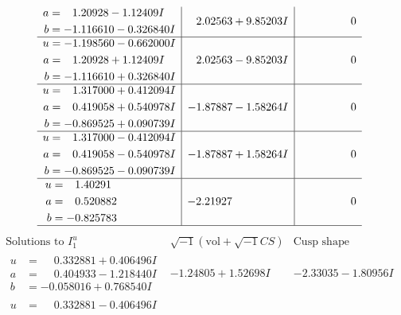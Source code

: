\documentclass[1p]{elsarticle_modified}
\theoremstyle{definition}
\newcommand{\I}{\sqrt{-1}}
\begin{document}
$$\begin{array}{c|c|c}
\begin{aligned}
a &= \phantom{-}1.20928 - 1.12409 I \\
b &= -1.116610 - 0.326840 I\end{aligned}
 & \phantom{-}2.02563 + 9.85203 I & \phantom{-0.000000 } 0 \\ \hline\begin{aligned}
u &= -1.198560 - 0.662000 I \\
a &= \phantom{-}1.20928 + 1.12409 I \\
b &= -1.116610 + 0.326840 I\end{aligned}
 & \phantom{-}2.02563 - 9.85203 I & \phantom{-0.000000 } 0 \\ \hline\begin{aligned}
u &= \phantom{-}1.317000 + 0.412094 I \\
a &= \phantom{-}0.419058 + 0.540978 I \\
b &= -0.869525 + 0.090739 I\end{aligned}
 & -1.87887 - 1.58264 I & \phantom{-0.000000 } 0 \\ \hline\begin{aligned}
u &= \phantom{-}1.317000 - 0.412094 I \\
a &= \phantom{-}0.419058 - 0.540978 I \\
b &= -0.869525 - 0.090739 I\end{aligned}
 & -1.87887 + 1.58264 I & \phantom{-0.000000 } 0 \\ \hline\begin{aligned}
u &= \phantom{-}1.40291\phantom{ +0.000000I} \\
a &= \phantom{-}0.520882\phantom{ +0.000000I} \\
b &= -0.825783\phantom{ +0.000000I}\end{aligned}
 & -2.21927\phantom{ +0.000000I} & \phantom{-0.000000 } 0\\
 \hline 
 \end{array}$$\newpage$$\begin{array}{c|c|c}  
\text{Solutions to }I^u_{1}& \I (\text{vol} + \sqrt{-1}CS) & \text{Cusp shape}\\
 \hline 
\begin{aligned}
u &= \phantom{-}0.332881 + 0.406496 I \\
a &= \phantom{-}0.404933 - 1.218440 I \\
b &= -0.058016 + 0.768540 I\end{aligned}
 & -1.24805 + 1.52698 I & -2.33035 - 1.80956 I \\ \hline\begin{aligned}
u &= \phantom{-}0.332881 - 0.406496 I \\

\end{aligned}
\end{array}$$
\end{document}
